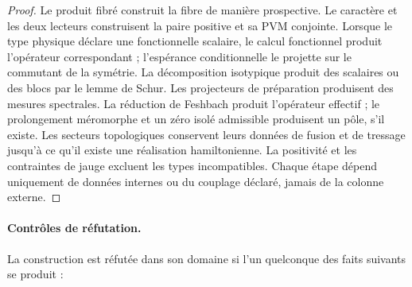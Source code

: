\begin{proof}
Le produit fibré construit la fibre de manière prospective. Le caractère et les
deux lecteurs construisent la paire positive et sa PVM conjointe. Lorsque le type
physique déclare une fonctionnelle scalaire, le calcul fonctionnel produit l'opérateur
correspondant ; l'espérance conditionnelle le projette sur le commutant de la
symétrie. La décomposition isotypique produit des scalaires ou des blocs par le lemme
de Schur. Les projecteurs de préparation produisent des mesures spectrales. La
réduction de Feshbach produit l'opérateur effectif ; le prolongement méromorphe
et un zéro isolé admissible produisent un pôle, s'il existe. Les secteurs
topologiques conservent leurs données de fusion et de tressage jusqu'à ce qu'il existe une
réalisation hamiltonienne. La positivité et les contraintes de jauge
excluent les types incompatibles. Chaque étape dépend uniquement de données internes ou
du couplage déclaré, jamais de la colonne externe.
\end{proof}

\paragraph{Contrôles de réfutation.}

La construction est réfutée dans son domaine si l'un quelconque des
faits suivants se produit :

